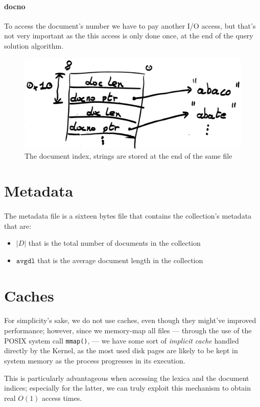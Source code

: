 \paragraph{docno}
To access the document's number we have to pay another I/O access, but that's not very important as the this access is only done once, at the end of the query solution algorithm.

\begin{figure}[h]
	\centering
	\includegraphics[width=0.7\linewidth]{assets/document_index}
	\caption{The document index, strings are stored at the end of the same file}
	\label{fig:documentindex}
\end{figure}

\section{Metadata}

\paragraph{}
The metadata file is a sixteen bytes file that contains the collection's metadata that are:

\begin{itemize}
	\item $|D|$ that is the total number of documents in the collection
	\item $\mathtt{avgdl}$ that is the average document length in the collection
\end{itemize}

\section{Caches}

\paragraph{}
For simplicity's sake, we do not use caches, even though they might've improved performance; however, since we memory-map all files --- through the use of the POSIX system call \texttt{mmap()}, --- we have some sort of \textit{implicit cache} handled directly by the Kernel, as the most used disk pages are likely to be kept in system memory as the process progresses in its execution.

This is particularly advantageous when accessing the lexica and the document indices; especially for the latter, we can truly exploit this mechanism to obtain real $O(1)$ access times.

